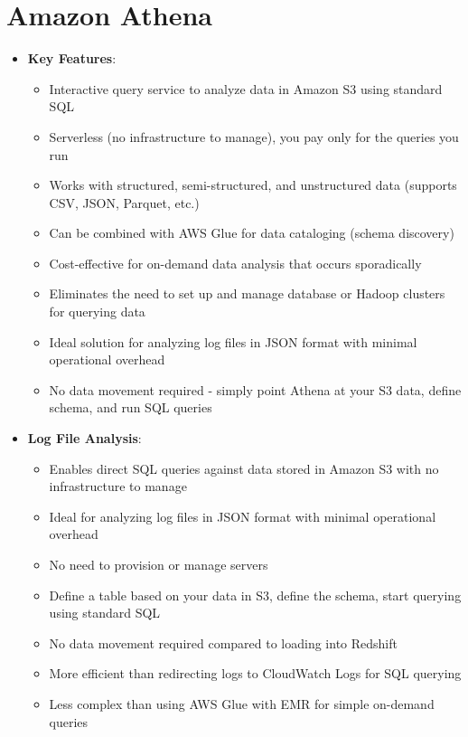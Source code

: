 \documentclass[11pt,a4paper]{report}
\begin{document}
\section{Amazon Athena}

\begin{itemize}
  \item \textbf{Key Features}:
\begin{itemize}
  \item Interactive query service to analyze data in Amazon S3 using standard SQL
  \item Serverless (no infrastructure to manage), you pay only for the queries you run
  \item Works with structured, semi-structured, and unstructured data (supports CSV, JSON, Parquet, etc.)
  \item Can be combined with AWS Glue for data cataloging (schema discovery)
  \item Cost-effective for on-demand data analysis that occurs sporadically
  \item Eliminates the need to set up and manage database or Hadoop clusters for querying data
  \item Ideal solution for analyzing log files in JSON format with minimal operational overhead
  \item No data movement required - simply point Athena at your S3 data, define schema, and run SQL queries
\end{itemize}
  \item \textbf{Log File Analysis}:
\begin{itemize}
  \item Enables direct SQL queries against data stored in Amazon S3 with no infrastructure to manage
  \item Ideal for analyzing log files in JSON format with minimal operational overhead
  \item No need to provision or manage servers
  \item Define a table based on your data in S3, define the schema, start querying using standard SQL
  \item No data movement required compared to loading into Redshift
  \item More efficient than redirecting logs to CloudWatch Logs for SQL querying
  \item Less complex than using AWS Glue with EMR for simple on-demand queries
\end{itemize}
\end{itemize}
\end{document}
